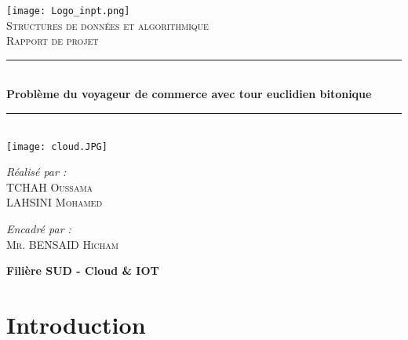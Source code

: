 \documentclass[12pt, openany]{report}
\newcommand{\HRule}{\rule{\linewidth}{0.5mm}}
\begin{document}
\begin{titlepage}
  \begin{sffamily}
  \begin{center}

    \texttt{[image: Logo\_inpt.png]}~\\[1cm]

    \textsc{\LARGE Structures de données et algorithmique}\\[1cm]

    \textsc{\huge Rapport de projet}\\[1cm]

    \HRule \\[0.4cm]
    { \huge \bfseries Problème du voyageur de commerce avec tour euclidien bitonique\\[0.4cm] }

    \HRule \\[1cm]
    \texttt{[image: cloud.JPG]}
    \\[2cm]

    \begin{minipage}{0.4\textwidth}
      \begin{flushleft} \large
        \emph{Réalisé par : } \textsc{\\TCHAH Oussama \\ LAHSINI Mohamed}
      \end{flushleft}
    \end{minipage}
    \begin{minipage}{0.4\textwidth}
      \begin{flushright} \large
        \emph{Encadré par :} \textsc{\\Mr. BENSAID Hicham}\\

      \end{flushright}
    \end{minipage}

    \vfill

    {\large \textbf{Filière SUD - Cloud \& IOT}}

  \end{center}
  \end{sffamily}
\end{titlepage}
\newpage
\tableofcontents
\newpage
\setlength{\parindent}{1cm}\section{Introduction}
\end{document}

